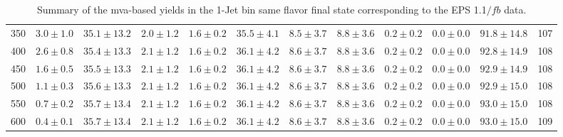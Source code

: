 \begin{table}
{\begin{center}
\begin{tabular}{l c c c c c c c c c c c }
350 & $3.0\pm1.0$ & $35.1\pm13.2$ & $2.0\pm1.2$ & $1.6\pm0.2$ & $35.5\pm4.1$ & $8.5\pm3.7$ & $8.8\pm3.6$ & $0.2\pm0.2$ & $0.0\pm0.0$ & $91.8\pm14.8$ & 107 \\
400 & $2.6\pm0.8$ & $35.4\pm13.3$ & $2.1\pm1.2$ & $1.6\pm0.2$ & $36.1\pm4.2$ & $8.6\pm3.7$ & $8.8\pm3.6$ & $0.2\pm0.2$ & $0.0\pm0.0$ & $92.8\pm14.9$ & 108 \\
450 & $1.6\pm0.5$ & $35.5\pm13.3$ & $2.1\pm1.2$ & $1.6\pm0.2$ & $36.1\pm4.2$ & $8.6\pm3.7$ & $8.8\pm3.6$ & $0.2\pm0.2$ & $0.0\pm0.0$ & $92.9\pm14.9$ & 108 \\
500 & $1.1\pm0.3$ & $35.6\pm13.3$ & $2.1\pm1.2$ & $1.6\pm0.2$ & $36.1\pm4.2$ & $8.6\pm3.7$ & $8.8\pm3.6$ & $0.2\pm0.2$ & $0.0\pm0.0$ & $92.9\pm15.0$ & 108 \\
550 & $0.7\pm0.2$ & $35.7\pm13.4$ & $2.1\pm1.2$ & $1.6\pm0.2$ & $36.1\pm4.2$ & $8.6\pm3.7$ & $8.8\pm3.6$ & $0.2\pm0.2$ & $0.0\pm0.0$ & $93.0\pm15.0$ & 108 \\
600 & $0.4\pm0.1$ & $35.7\pm13.4$ & $2.1\pm1.2$ & $1.6\pm0.2$ & $36.1\pm4.2$ & $8.6\pm3.7$ & $8.8\pm3.6$ & $0.2\pm0.2$ & $0.0\pm0.0$ & $93.0\pm15.0$ & 109 \\
\hline
\end{tabular}
\end{center}
}
\caption{Summary of the mva-based yields in the 1-Jet bin same flavor final state corresponding to the EPS 1.1$/fb$ data.}
\end{table}

